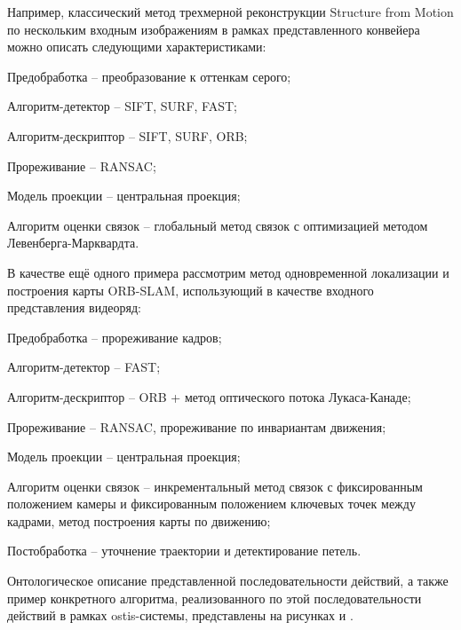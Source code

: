 Например, классический метод трехмерной реконструкции Structure from Motion по нескольким
входным изображениям в рамках представленного конвейера можно описать следующими характеристиками:
\begin{textitemize}
    \item Предобработка -- преобразование к оттенкам серого;
    \item Алгоритм-детектор -- SIFT, SURF, FAST;
    \item Алгоритм-дескриптор -- SIFT, SURF, ORB;
    \item Прореживание -- RANSAC;
    \item Модель проекции -- центральная проекция;
    \item Алгоритм оценки связок -- глобальный метод связок с оптимизацией методом Левенберга-Марквардта.
\end{textitemize}
В качестве ещё одного примера рассмотрим метод одновременной локализации и построения карты ORB-SLAM, использующий в качестве входного представления видеоряд:
\begin{textitemize}
    \item Предобработка -- прореживание кадров;
    \item Алгоритм-детектор -- FAST;
    \item Алгоритм-дескриптор -- ORB + метод оптического потока Лукаса-Канаде;
    \item Прореживание -- RANSAC, прореживание по инвариантам движения;
    \item Модель проекции -- центральная проекция;
    \item Алгоритм оценки связок -- инкрементальный метод связок с фиксированным положением камеры и фиксированным положением ключевых точек между кадрами, метод построения карты по движению;
    \item Постобработка -- уточнение траектории и детектирование петель.
\end{textitemize}

Онтологическое описание представленной последовательности действий, а также пример конкретного алгоритма, реализованного по этой последовательности действий в рамках ostis-системы, представлены на рисунках \textit{} и \textit{}.

